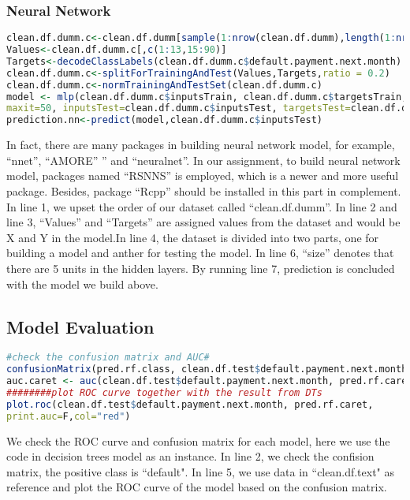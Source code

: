 \documentclass[a4paper,11pt]{article}
\begin{document}
\subsubsection{Neural Network}
\begin{lstlisting}[language=R]
clean.df.dumm.c<-clean.df.dumm[sample(1:nrow(clean.df.dumm),length(1:nrow(clean.df.dumm))),1:ncol(clean.df.dumm)]
Values<-clean.df.dumm.c[,c(1:13,15:90)]
Targets<-decodeClassLabels(clean.df.dumm.c$default.payment.next.month)
clean.df.dumm.c<-splitForTrainingAndTest(Values,Targets,ratio = 0.2)
clean.df.dumm.c<-normTrainingAndTestSet(clean.df.dumm.c)
model <- mlp(clean.df.dumm.c$inputsTrain, clean.df.dumm.c$targetsTrain, size=5, learnFuncParams=c(0.1), 
maxit=50, inputsTest=clean.df.dumm.c$inputsTest, targetsTest=clean.df.dumm.c$targetsTest)
prediction.nn<-predict(model,clean.df.dumm.c$inputsTest)
\end{lstlisting}
In fact, there are many packages in building neural network model, for example, ``nnet'', ``AMORE”
'' and ``neuralnet''. In our assignment, to build neural network model, packages named ``RSNNS'' is employed, which is a newer and more useful package. Besides, package ``Rcpp'' should be installed in this part in complement. In line 1, we upset the order of our dataset called ``clean.df.dumm''. In line 2 and line 3, ``Values'' and ``Targets'' are assigned values from the dataset and would be X and Y in the model.In line 4, the dataset is divided into two parts, one for building a model and anther for testing the model. In line 6, ``size'' denotes that there are 5 units in the hidden layers. By running line 7, prediction is concluded with the model we build above.

\subsection{Model Evaluation}
\begin{lstlisting}[language=R]
#check the confusion matrix and AUC#
confusionMatrix(pred.rf.class, clean.df.test$default.payment.next.month)
auc.caret <- auc(clean.df.test$default.payment.next.month, pred.rf.caret) 
########plot ROC curve together with the result from DTs
plot.roc(clean.df.test$default.payment.next.month, pred.rf.caret, 
print.auc=F,col="red")
\end{lstlisting}
We check the ROC curve and confusion matrix for each model, here we use the code in decision trees model as an instance. In line 2, we check the confision matrix, the positive class is ``default". In line 5, we use data in ``clean.df.text" as reference and plot the ROC curve of the model based on the confusion matrix.
\end{document}
